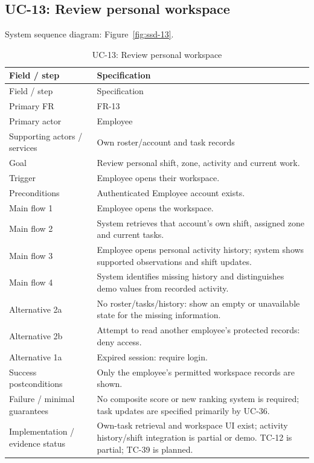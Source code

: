\subsection*{UC-13: Review personal workspace}
\label{uc:13}
System sequence diagram: Figure~\ref{fig:ssd-13}.

\begin{longtable}{P{0.23\textwidth}P{0.67\textwidth}}
\caption{UC-13: Review personal workspace}\\
\toprule
Field / step & Specification\\
\midrule
\endfirsthead
\toprule
Field / step & Specification\\
\midrule
\endhead
Primary FR & FR-13\\
Primary actor & Employee\\
Supporting actors / services & Own roster/account and task records\\
Goal & Review personal shift, zone, activity and current work.\\
Trigger & Employee opens their workspace.\\
Preconditions & Authenticated Employee account exists.\\
Main flow 1 & Employee opens the workspace.\\
Main flow 2 & System retrieves that account's own shift, assigned zone and current tasks.\\
Main flow 3 & Employee opens personal activity history; system shows supported observations and shift updates.\\
Main flow 4 & System identifies missing history and distinguishes demo values from recorded activity.\\
Alternative 2a & No roster/tasks/history: show an empty or unavailable state for the missing information.\\
Alternative 2b & Attempt to read another employee's protected records: deny access.\\
Alternative 1a & Expired session: require login.\\
Success postconditions & Only the employee's permitted workspace records are shown.\\
Failure / minimal guarantees & No composite score or new ranking system is required; task updates are specified primarily by UC-36.\\
Implementation / evidence status & Own-task retrieval and workspace UI exist; activity history/shift integration is partial or demo. TC-12 is partial; TC-39 is planned.\\
\bottomrule
\end{longtable}

